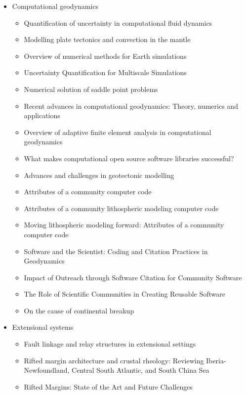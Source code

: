 \begin{itemize}
\item Computational geodynamics
   \begin{itemize}
   \item [\nineteenninetyseven] Quantification of uncertainty in computational fluid dynamics \cite{roac97}
   \item [\twothousand] Modelling plate tectonics and convection in the mantle \cite{mogz00}
   \item [\twothousandone] Overview of numerical methods for Earth simulations \cite{momd01}
   \item [\twothousandtwo] Uncertainty Quantification for Multiscale Simulations \cite{degg02}
   \item [\twothousandfive] Numerical solution of saddle point problems \cite{begl05}
   \item [\twothousandeight] Recent advances in computational geodynamics: Theory, numerics and applications \cite{kags08}
   \item [\twothousandthirteen] Overview of adaptive finite element analysis in computational geodynamics \cite{masm13}
   \item [\twothousandthirteen] What makes computational open source software libraries successful? \cite{bahe13}
   \item [\twothousandfourteen] Advances and challenges in geotectonic modelling \cite{bufy14}
   \item [\twothousandfifteen] Attributes of a community computer code \cite{comc15}
   \item [\twothousandfifteen] Attributes of a community lithospheric modeling computer code \cite{comc15}
   \item [\twothousandfifteen] Moving lithospheric modeling forward: Attributes of a community computer code \cite{comc15}
   \item [\twothousandseventeen] Software and the Scientist: Coding and Citation Practices in Geodynamics \cite{hwfs17}
   \item [\twothousandnineteen] Impact of Outreach through Software Citation for Community Software \cite{hwpc19}
   \item [\twothousandnineteen] The Role of Scientific Communities in Creating Reusable Software \cite{kehg19}
   \item [\twothousandtwenty] On the cause of continental breakup \cite{niu20}
   \end{itemize}

\item Extensional systems
   \begin{itemize}
   \item [\twothousandsixteen] Fault linkage and relay structures in extensional settings \cite{foro16}
   \item [\twothousandseventeen] Rifted margin architecture and crustal rheology: Reviewing 
                Iberia-Newfoundland, Central South Atlantic, and South China Sea \cite{brhc17}
   \item [\twothousandnineteen] Rifted Margins: State of the Art and Future Challenges \cite{pema19}\\
   \end{itemize}


\end{itemize}
